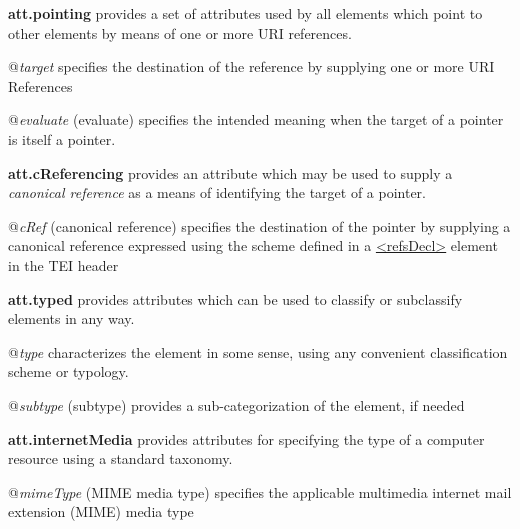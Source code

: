 \begin{sansreflist}
\item [\textbf{att.pointing}] provides a set of attributes used by all elements which point to other elements by means of one or more URI references.\hfil\\[-10pt]\begin{sansreflist}
    \item[@{\itshape target}]
  specifies the destination of the reference by supplying one or more URI References
    \item[@{\itshape evaluate}]
  (evaluate) specifies the intended meaning when the target of a pointer is itself a pointer.
\end{sansreflist}  
\item [\textbf{att.cReferencing}] provides an attribute which may be used to supply a \textit{canonical reference} as a means of identifying the target of a pointer.\hfil\\[-10pt]\begin{sansreflist}
    \item[@{\itshape cRef}]
  (canonical reference) specifies the destination of the pointer by supplying a canonical reference expressed using the scheme defined in a \hyperref[TEI.refsDecl]{<refsDecl>} element in the TEI header
\end{sansreflist}  
\item [\textbf{att.typed}] provides attributes which can be used to classify or subclassify elements in any way.\hfil\\[-10pt]\begin{sansreflist}
    \item[@{\itshape type}]
  characterizes the element in some sense, using any convenient classification scheme or typology.
    \item[@{\itshape subtype}]
  (subtype) provides a sub-categorization of the element, if needed
\end{sansreflist}  
\item [\textbf{att.internetMedia}] provides attributes for specifying the type of a computer resource using a standard taxonomy.\hfil\\[-10pt]\begin{sansreflist}
    \item[@{\itshape mimeType}]
  (MIME media type) specifies the applicable multimedia internet mail extension (MIME) media type
\end{sansreflist}  
\end{sansreflist}
\par

